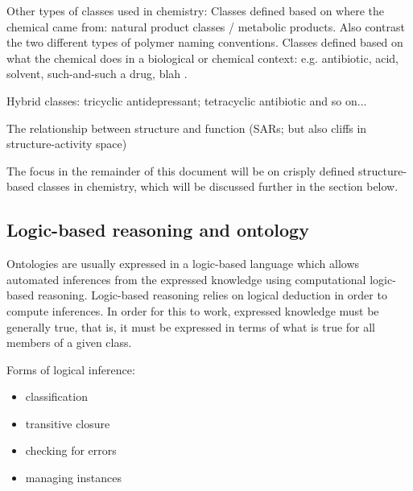 \documentclass[10pt]{bmc_article}
\newenvironment{bmcformat}{\baselineskip20pt\sloppy\setboolean{publ}{false}}{\baselineskip20pt\sloppy}
\begin{document}
\begin{bmcformat}
Other types of classes used in chemistry:  %
Classes defined based on where the chemical came from:  natural product classes / metabolic products.  Also contrast the two different types of polymer naming conventions. 
Classes defined based on what the chemical does in a biological or chemical context: e.g. antibiotic, acid, solvent, such-and-such a drug, blah \cite{batchelor2011}. %

Hybrid classes:  tricyclic antidepressant; tetracyclic antibiotic and so on...

The relationship between structure and function (SARs; but also cliffs in structure-activity space)

The focus in the remainder of this document will be on crisply defined structure-based classes in chemistry, which will be discussed further in the section \textit{} below. %


\subsection*{Logic-based reasoning and ontology}
\label{sec:backlogic}

 
Ontologies are usually expressed in a logic-based language which allows automated inferences from the expressed knowledge using computational logic-based reasoning.  Logic-based reasoning relies on logical deduction in order to compute inferences.  In order for this to work, expressed knowledge must be generally true, that is, it must be expressed in terms of what is true for all members of a given class. 

Forms of logical inference: 
\begin{itemize}
	\item  classification
	\item  transitive closure
	\item  checking for errors
	\item  managing instances
\end{itemize}


\end{bmcformat}
\end{document}
